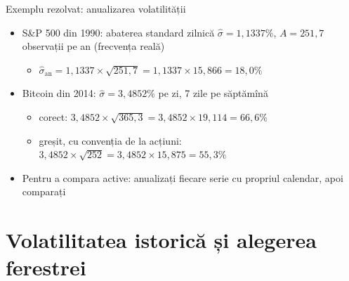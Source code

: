 \begin{frame}{Exemplu rezolvat: anualizarea volatilității}
\itemsize{\small}
\begin{itemize}
    \item S\&P 500 din 1990: abaterea standard zilnică $\hat\sigma = 1{,}1337\%$, $A = 251{,}7$ observații pe an (frecvența reală)
    \begin{itemize}
        \item $\hat\sigma_{\text{an}} = 1{,}1337 \times \sqrt{251{,}7} = 1{,}1337 \times 15{,}866 = 18{,}0\%$
    \end{itemize}
    \item Bitcoin din 2014: $\hat\sigma = 3{,}4852\%$ pe zi, 7 zile pe săptămînă
    \begin{itemize}
        \item corect: $3{,}4852 \times \sqrt{365{,}3} = 3{,}4852 \times 19{,}114 = 66{,}6\%$
        \item greșit, cu convenția de la acțiuni: $3{,}4852 \times \sqrt{252} = 3{,}4852 \times 15{,}875 = 55{,}3\%$
    \end{itemize}
    \item Pentru a compara active: anualizați fiecare serie cu propriul calendar, apoi comparați
\end{itemize}
\end{frame}


\section{Volatilitatea istorică și alegerea ferestrei}

